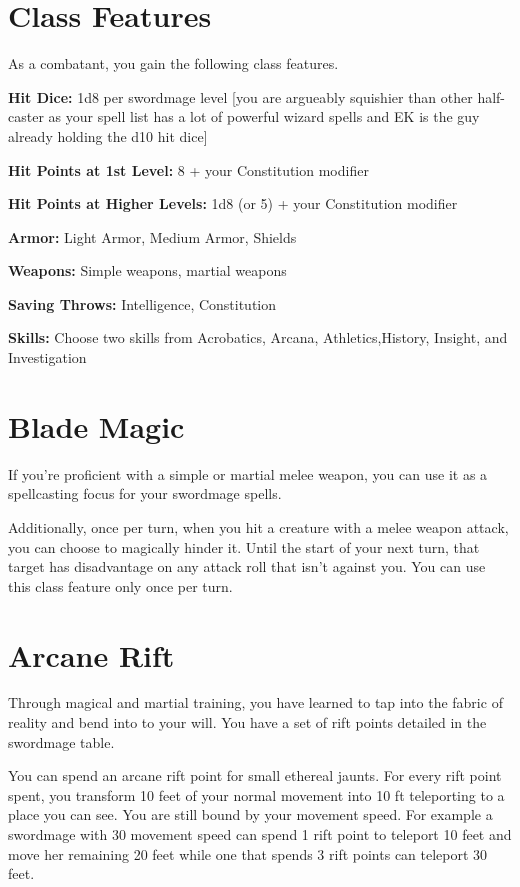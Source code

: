 \begin{multicols*}{2}



\section*{Class Features} 

As a combatant, you gain the following class features.

\textbf{Hit Dice:} 1d8 per swordmage level {\color{red} [you are argueably squishier than other half-caster as your spell list has a lot of powerful wizard spells and EK is the guy already holding the d10 hit dice]}

\textbf{Hit Points at 1st Level:} 8 + your Constitution modifier

\textbf{Hit Points at Higher Levels:} 1d8 (or 5) + your Constitution modifier


\textbf{Armor:} Light Armor, Medium Armor, Shields

\textbf{Weapons:} Simple weapons, martial weapons

\textbf{Saving Throws:} Intelligence, Constitution

\textbf{Skills:} Choose two skills from Acrobatics, Arcana, Athletics,History, Insight, and Investigation


\section*{Blade Magic}

If you’re proficient with a simple or martial melee weapon, you can use it as a spellcasting focus for your swordmage spells.

Additionally, once per turn, when you hit a creature with a melee weapon attack,
you can choose to magically hinder it.
Until the start of your next turn, that target has disadvantage on any attack roll that isn't against you. You can use this class feature only once per turn.

\section*{Arcane Rift} 

Through magical and martial training, you have learned to tap into the fabric of reality and bend into to your will.
You have a set of rift points detailed in the swordmage table. 



You can spend an arcane rift point for small ethereal jaunts. For every rift point spent, you transform 10 feet of your normal movement into 10 ft teleporting to a place you can see. You are still bound by your movement speed. For example a swordmage with 30 movement speed can spend 1 rift point to teleport 10 feet and move her remaining 20 feet while one that spends 3 rift points can teleport 30 feet.


\end{multicols*}
